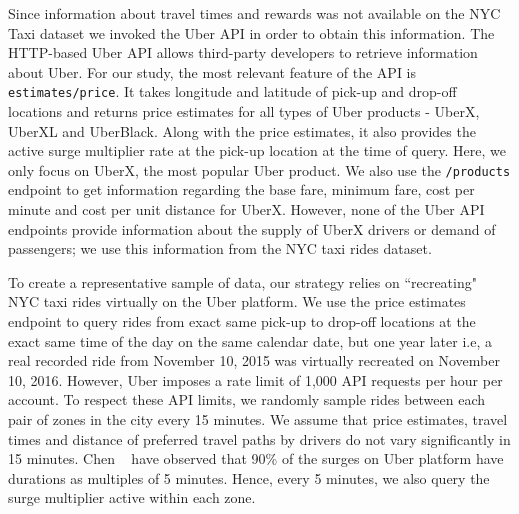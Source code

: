  Since information about travel times 
and rewards was not available on the NYC Taxi dataset we invoked the Uber API in order
to obtain this information.
The HTTP-based Uber API allows third-party developers to retrieve information about Uber. For our study, the most relevant feature of the API is \texttt{estimates/price}. It takes longitude and latitude of pick-up and drop-off locations and returns price estimates for all types of Uber products - UberX, UberXL and UberBlack. Along with the price estimates, it also provides the active surge multiplier rate at the pick-up location at the time of query.  Here, we only focus on UberX, the most popular Uber product. We also use the \texttt{/products} endpoint to get information regarding the base fare, minimum fare, cost per minute and cost per unit distance for UberX. However, none of the Uber API endpoints provide information about the supply of UberX drivers or demand of passengers; we use this information from the
NYC taxi rides dataset.

To create a representative sample of data, our strategy relies on ``recreating" NYC taxi rides virtually on the Uber platform. 
We use the price estimates endpoint to query rides from exact same pick-up to drop-off locations at the exact same time of the 
day on the same calendar date, but one year later i.e, a real recorded ride from November 10, 2015 was virtually recreated on November 10, 2016. However, Uber imposes a rate limit of 1,000 API requests per hour per account. To respect these API limits, we randomly sample rides between each pair of zones in the city every 15 minutes. We assume that price estimates, travel times and distance of preferred travel paths by drivers do not vary significantly in 15 minutes. Chen {\etal}~\cite{chen2015peeking} have observed that 90\% of the surges on Uber platform have durations as multiples of 5 minutes. Hence, every 5 minutes, we also query the surge multiplier active within each zone.

%

